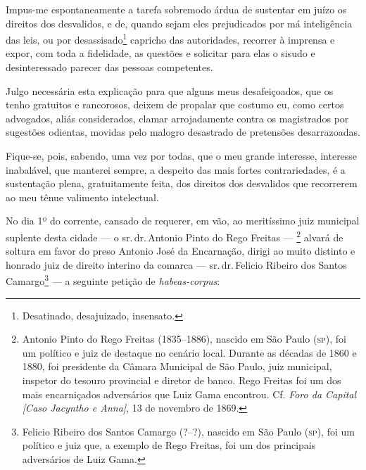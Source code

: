 Impus-me espontaneamente a tarefa sobremodo árdua de sustentar em juízo
os direitos dos desvalidos, e de, quando sejam eles prejudicados por má
inteligência das leis, ou por desassisado\footnote{Desatinado,
  desajuizado, insensato.} capricho das autoridades, recorrer à imprensa
e expor, com toda a fidelidade, as questões e solicitar para elas o
sisudo e desinteressado parecer das pessoas competentes.

Julgo necessária esta explicação para que alguns meus desafeiçoados, que
os tenho gratuitos e rancorosos, deixem de propalar que costumo eu, como
certos advogados, aliás considerados, clamar arrojadamente contra os
magistrados por sugestões odientas, movidas pelo malogro desastrado de
pretensões desarrazoadas.

Fique-se, pois, sabendo, uma vez por todas, que o meu grande interesse,
interesse inabalável, que manterei sempre, a despeito das mais fortes
contrariedades, é a sustentação plena, gratuitamente feita, dos direitos
dos desvalidos que recorrerem ao meu tênue valimento intelectual.

\asterisc{}

No dia 1º do corrente, cansado de requerer, em vão, ao meritíssimo juiz
municipal suplente desta cidade --- o sr.\,dr.\,Antonio Pinto do Rego
Freitas --- \footnote{Antonio Pinto do Rego Freitas (1835--1886), nascido em
  São Paulo (\textsc{sp}), foi um político e juiz de destaque no cenário local.
  Durante as décadas de 1860 e 1880, foi presidente da Câmara Municipal
  de São Paulo, juiz municipal, inspetor do tesouro provincial e diretor
  de banco. Rego Freitas foi um dos mais encarniçados adversários que
  Luiz Gama encontrou. Cf. \emph{Foro da Capital {[}Caso Jacyntho e
  Anna{]}}, 13 de novembro de 1869.\label{rego}} alvará de soltura em favor do preso Antonio
José da Encarnação, dirigi ao muito distinto e honrado juiz de direito
interino da comarca --- sr.\,dr.\,Felicio Ribeiro dos Santos
Camargo\footnote{Felicio Ribeiro dos Santos Camargo (?--?), nascido em
  São Paulo (\textsc{sp}), foi um político e juiz que, a exemplo de Rego Freitas,
  foi um dos principais adversários de Luiz Gama.\label{felicio}} --- a seguinte petição
de \emph{habeas-corpus}:

